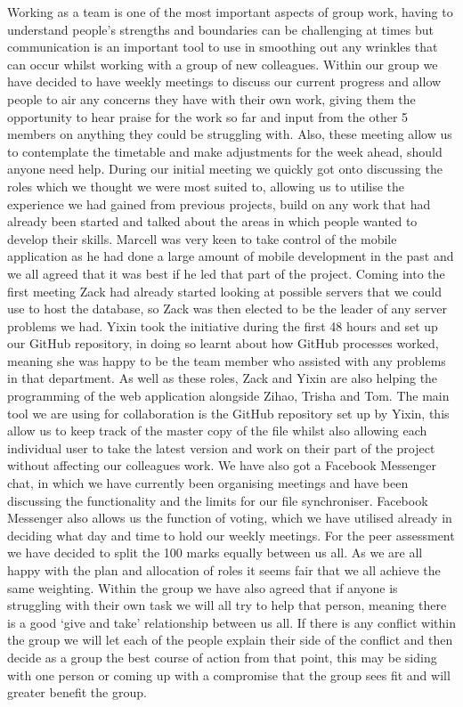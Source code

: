 \documentclass[11pt]{informatics-report}
\begin{document}
Working as a team is one of the most important aspects of group work, having to understand people’s strengths and boundaries can be challenging at times but communication is an important tool to use in smoothing out any wrinkles that can occur whilst working with a group of new colleagues. Within our group we have decided to have weekly meetings to discuss our current progress and allow people to air any concerns they have with their own work, giving them the opportunity to hear praise for the work so far and input from the other 5 members on anything they could be struggling with. Also, these meeting allow us to contemplate the timetable and make adjustments for the week ahead, should anyone need help.
During our initial meeting we quickly got onto discussing the roles which we thought we were most suited to, allowing us to utilise the experience we had gained from previous projects, build on any work that had already been started and talked about the areas in which people wanted to develop their skills. Marcell was very keen to take control of the mobile application as he had done a large amount of mobile development in the past and we all agreed that it was best if he led that part of the project. Coming into the first meeting Zack had already started looking at possible servers that we could use to host the database, so Zack was then elected to be the leader of any server problems we had. Yixin took the initiative during the first 48 hours and set up our GitHub repository, in doing so learnt about how GitHub processes worked, meaning she was happy to be the team member who assisted with any problems in that department. As well as these roles, Zack and Yixin are also helping the programming of the web application alongside Zihao, Trisha and Tom.
The main tool we are using for collaboration is the GitHub repository set up by Yixin, this allow us to keep track of the master copy of the file whilst also allowing each individual user to take the latest version and work on their part of the project without affecting our colleagues work. We have also got a Facebook Messenger chat, in which we have currently been organising meetings and have been discussing the functionality and the limits for our file synchroniser. Facebook Messenger also allows us the function of voting, which we have utilised already in deciding what day and time to hold our weekly meetings.
For the peer assessment we have decided to split the 100 marks equally between us all. As we are all happy with the plan and allocation of roles it seems fair that we all achieve the same weighting. Within the group we have also agreed that if anyone is struggling with their own task we will all try to help that person, meaning there is a good ‘give and take’ relationship between us all.  If there is any conflict within the group we will let each of the people explain their side of the conflict and then decide as a group the best course of action from that point, this may be siding with one person or coming up with a compromise that the group sees fit and will greater benefit the group. 
\end{document}
